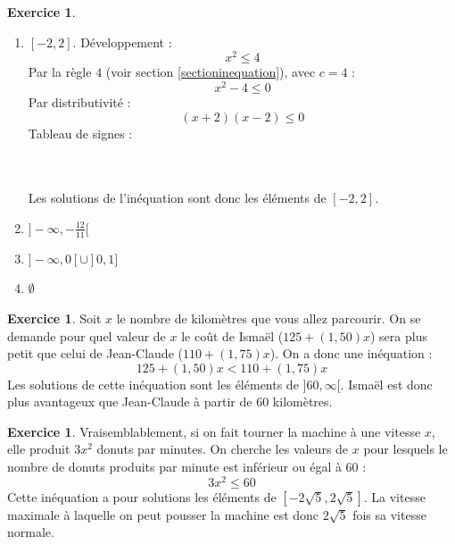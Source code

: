 \documentclass[a4paper,13pt]{scrreprt}
\theoremstyle{plain}
\theoremstyle{definition}
\newtheorem{exo}[subsection]{Exercice}
\begin{document}
\begin{exo}
	\begin{enumerate}
		\item $[-2, 2]$. Développement : \\
		$$x^2 \le 4$$
		Par la règle $4$ (voir section \ref{sectioninequation}), avec $c=4$ :
		$$x^2 - 4 \le 0$$
		Par distributivité :
		$$(x+2) (x-2) \le 0$$
		Tableau de signes : \\
		 \\
		~~\\
		Les solutions de l'inéquation sont donc les éléments de $[-2, 2]$.
		\item $]-\infty, -\frac{12}{11}[$
		\item $]-\infty, 0[ \cup  ]0, 1]$
		\item $\emptyset$
	\end{enumerate}
\end{exo}

\begin{exo} Soit $x$ le nombre de kilomètres que vous allez parcourir. On se demande pour quel valeur de $x$ le coût de Ismaël ($125+(1,50)x$) sera plus petit que celui de Jean-Claude ($110+(1,75)x$). On a donc une inéquation :
	$$125+(1,50)x < 110+(1,75)x$$
	Les solutions de cette inéquation sont les éléments de $]60, \infty[$. Ismaël est donc plus avantageux que Jean-Claude à partir de $60$ kilomètres.
\end{exo}

\begin{exo} Vraisemblablement, si on fait tourner la machine à une vitesse $x$, elle produit $3x^2$ donuts par minutes. On cherche les valeurs de $x$ pour lesquels le nombre de donuts produits par minute est inférieur ou égal à $60$ :
	$$3x^2 \le 60$$
	Cette inéquation a pour solutions les éléments de $[-2 \sqrt{5}, 2 \sqrt{5}]$. La vitesse maximale à laquelle on peut pousser la machine est donc $2 \sqrt{5}$ fois sa vitesse normale.
\end{exo}
\end{document}
